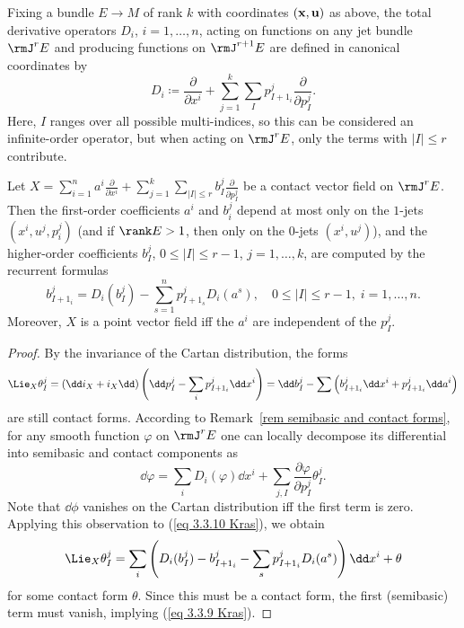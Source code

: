 \begin{defn}
    Fixing a bundle $E\to M$ of rank $k$ with coordinates $(\bf{x},\bf{u})$ as above, the total derivative operators $D_i$, $i=1,\ldots,n$, acting on functions on any jet bundle $\rmJ^rE$ and producing functions on $\rmJ^{r+1}E$ are defined in canonical coordinates by 
    \[D_i \coloneqq \frac{\partial}{\partial x^i}+\sum_{j=1}^k\sum_{I}p_{I+1_i}^j\frac{\partial}{\partial p^j_I}.\label{eq def total derivative}\]
    Here, $I$ ranges over all possible multi-indices, so this can be considered an infinite-order operator, but when acting on $\rmJ^r E$, only the terms with $|I|\leq r$ contribute.
\end{defn}

\begin{thm}\label{thm 3.3.4 Kras}
     Let $X=\sum_{i=1}^n a^i \frac{\partial}{\partial x^i}+\sum_{j=1}^k \sum_{|I|\leq r}b^j_I \frac{\partial}{\partial p^j_I}$ be a contact vector field on $\rmJ^r E$. Then the first-order coefficients $a^i$ and $b^j_i$ depend at most only on the $1$-jets $(x^i,u^j,p^j_i)$ (and if $\rank E>1$, then only on the $0$-jets $(x^i,u^j)$), and the higher-order coefficients $b^j_I$, $0\leq |I|\leq r-1$, $j=1,\ldots,k$, are computed by the recurrent formulas 
     \[b^j_{I+1_i}=D_i(b^j_I)-\sum_{s=1}^n p^j_{I+1_s}D_i(a^s),\quad 0\leq |I|\leq r-1,\; i=1,\ldots,n. \label{eq 3.3.9 Kras}\]
    Moreover, $X$ is a point vector field iff the $a^i$ are independent of the $p^j_I$.
\end{thm}
\begin{proof}
    By the invariance of the Cartan distribution, the forms 
    \[\Lie_X \theta^j_I=(\dd i_X+i_X\dd)\left(\dd p^j_I-\sum_i p^j_{I+1_i}\dd x^i\right)=\dd b^j_I-\sum\left(b^j_{I+1_i}\dd x^i+p^j_{I+1_i}\dd a^i\right)\label{eq 3.3.10 Kras}\]
    are still contact forms.  According to Remark~\ref{rem semibasic and contact forms}, for any smooth function $\varphi$ on $\rmJ^rE$ one can locally decompose its differential into semibasic and contact components as
    \[\dd \varphi=\sum_i D_i(\varphi)\dd x^i+\sum_{j,I}\frac{\partial\varphi}{\partial p^j_I}\theta^j_I.\]
    Note that $\dd\phi$ vanishes on the Cartan distribution iff the first term is zero. Applying this observation to (\ref{eq 3.3.10 Kras}), we obtain 
    \[\Lie_X \theta^j_I=\sum_i \left(D_i(b^j_I)-b^j_{I+1_i}-\sum_s p^j_{I+1_i}D_i(a^s)\right)\dd x^i+\theta\]
    for some contact form $\theta$. Since this must be a contact form, the first (semibasic) term must vanish, implying (\ref{eq 3.3.9 Kras}).
\end{proof}

